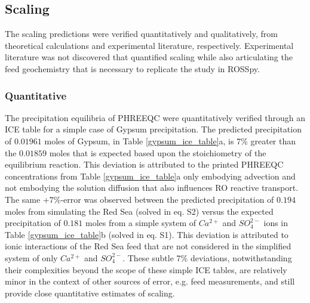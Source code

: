 \subsection{Scaling}
The scaling predictions were verified quantitatively and qualitatively, from theoretical calculations and experimental literature, respectively. Experimental literature was not discovered that quantified scaling while also articulating the feed geochemistry that is necessary to replicate the study in ROSSpy. 

\subsubsection{Quantitative}
The precipitation equilibria of PHREEQC were quantitatively verified through an ICE table for a simple case of Gypsum precipitation. The predicted precipitation of $0.01961$ moles of Gypsum, in Table \ref{gypsum_ice_table}a, is 7\% greater than the $0.01859$ moles that is expected based upon the stoichiometry of the equilibrium reaction. This deviation is attributed to the printed PHREEQC concentrations from Table \ref{gypsum_ice_table}a only embodying advection and not embodying the solution diffusion that also influences RO reactive transport. The same $+7\%$-error was observed between the predicted precipitation of $0.194$ moles from simulating the Red Sea (solved in eq. S2) versus the expected precipitation of $0.181$ moles from a simple system of $Ca^{2+}$ and $SO_4^{2-}$ ions in Table \ref{gypsum_ice_table}b (solved in eq. S1). This deviation is attributed to ionic interactions of the Red Sea feed that are not considered in the simplified system of only $Ca^{2+}$ and $SO_4^{2-}$. These subtle 7\% deviations, notwithstanding their complexities beyond the scope of these simple ICE tables, are relatively minor in the context of other sources of error, e.g. feed measurements, and still provide close quantitative estimates of scaling.

